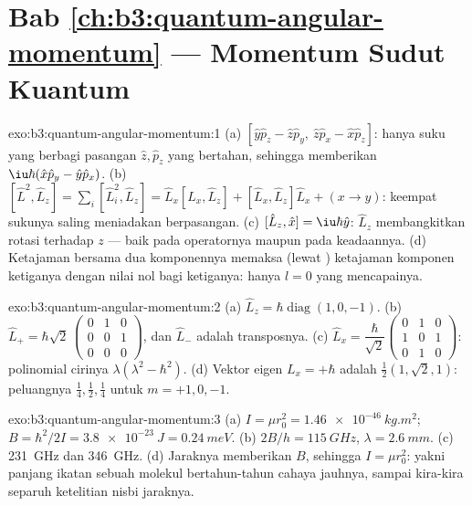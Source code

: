 \section*{Bab \ref{ch:b3:quantum-angular-momentum} --- Momentum Sudut Kuantum}

\begin{solution}{exo:b3:quantum-angular-momentum:1}
(a) $[\hat y\hat p_z - \hat z\hat p_y,\ \hat z\hat p_x - \hat x\hat
p_z]$: hanya suku yang berbagi pasangan $\hat z, \hat p_z$ yang
bertahan, sehingga memberikan $\iu\hbar(\hat x\hat p_y - \hat y\hat p_x)$. (b) $[\hat
L^2, \hat L_z] = \sum_i[\hat L_i^2, \hat L_z] = \hat L_x[\hat L_x,
\hat L_z] + [\hat L_x, \hat L_z]\hat L_x + (x \to y)$: keempat sukunya
saling meniadakan berpasangan. (c) $[\hat L_z, \hat x] = \iu\hbar\hat y$:
$\hat L_z$ membangkitkan rotasi terhadap $z$ --- baik pada operatornya
maupun pada keadaannya. (d) Ketajaman bersama dua komponennya memaksa
(lewat ) ketajaman komponen ketiganya dengan nilai nol bagi
ketiganya: hanya $l = 0$ yang mencapainya.
\end{solution}

\begin{solution}{exo:b3:quantum-angular-momentum:2}
(a) $\hat L_z = \hbar\operatorname{diag}(1, 0, -1)$. (b) $\hat L_+ =
\hbar\sqrt2\,\begin{pmatrix}0&1&0\\0&0&1\\0&0&0
\end{pmatrix}$, dan $\hat L_-$ adalah transposnya. (c) $\hat L_x =
\dfrac{\hbar}{\sqrt2}\begin{pmatrix}0&1&0\\1&0&1\\0&1&0
\end{pmatrix}$: polinomial cirinya $\lambda(\lambda^2 -
\hbar^2)$. (d) Vektor eigen $L_x = +\hbar$ adalah $\tfrac12(1,
\sqrt2, 1)$: peluangnya $\tfrac14, \tfrac12, \tfrac14$ untuk $m =
+1, 0, -1$.
\end{solution}

\begin{solution}{exo:b3:quantum-angular-momentum:3}
(a) $I = \mu r_0^2 = \qty{1.46e-46}{kg.m^2}$; $B = \hbar^2/2I =
\qty{3.8e-23}{J} = \qty{0.24}{meV}$. (b) $2B/h = \qty{115}{GHz}$,
$\lambda = \qty{2.6}{mm}$. (c) \qty{231}{GHz} dan \qty{346}{GHz}.
(d) Jaraknya memberikan $B$, sehingga $I = \mu r_0^2$: yakni panjang
ikatan sebuah molekul bertahun-tahun cahaya jauhnya, sampai kira-kira
separuh ketelitian nisbi jaraknya.
\end{solution}

